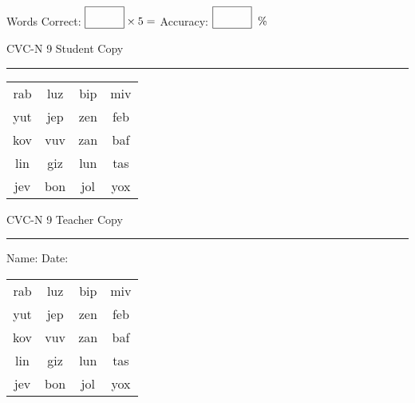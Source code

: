 \documentclass{memoir}
\begin{document}
\small

Words Correct: $\fbox{\phantom{\huge 100}} \times 5 = $ Accuracy: $\fbox{\phantom{\huge 100}}\;\; \%$ 

\vfill

\newpage


\footnotesize \noindent
CVC-N 9 \hfill Student Copy
\smallskip
\hrule

\Large

\setlength{\tabcolsep}{14pt}
\def\arraystretch{2}

{\selectfont


\begin{vplace}[0.5]
\begin{center}
\begin{tabular}{cccc}
rab & luz & bip & miv \\
yut & jep & zen & feb \\
kov & vuv & zan & baf \\
lin & giz & lun & tas \\
jev & bon & jol & yox \\
\end{tabular}
\end{center}
\end{vplace}

}

\newpage

\footnotesize \noindent
CVC-N 9 \hfill Teacher Copy
\smallskip
\hrule

\small

\vfill

\noindent
Name: \underline{\hspace{1.75in}} \hfill Date: \underline{\hspace{1in}}

\Large

{\selectfont


\begin{vplace}[0.5]
\begin{center}
\begin{tabular}{cccc}
rab & luz & bip & miv \\
yut & jep & zen & feb \\
kov & vuv & zan & baf \\
lin & giz & lun & tas \\
jev & bon & jol & yox \\
\end{tabular}
\end{center}
\end{vplace}



}
\end{document}
